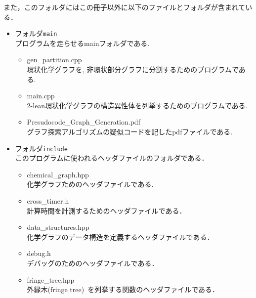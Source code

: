 \documentclass[11pt,titlepage,dvipdfmx,twoside]{jarticle}
\begin{document}
また，このフォルダにはこの冊子以外に以下のファイルとフォルダが含まれている．
%
	\begin{itemize}
		
	\item フォルダ{\tt main}\\
		プログラムを走らせるmainフォルダである.
		\begin{itemize}
			\item{gen\_partition.cpp}\\
				環状化学グラフを, 非環状部分グラフに分割するためのプログラムである.
				
			\item{main.cpp}\\
				2-lean環状化学グラフの構造異性体を列挙するためのプログラムである.

			\item{Presudocode\_Graph\_Generation.pdf}\\
			グラフ探索アルゴリズムの疑似コードを記したpdfファイルである.
		\end{itemize}
		
	\item フォルダ{\tt include}\\
		このプログラムに使われるヘッダファイルのフォルダである．
		\begin{itemize}
			\item{chemical\_graph.hpp}\\
			  化学グラフためのヘッダファイルである.
			\item{cross\_timer.h}\\
				計算時間を計測するためのヘッダファイルである．
				
			\item{data\_structures.hpp}\\
				化学グラフのデータ構造を定義するヘッダファイルである． 
				
			\item{debug.h}\\
				デバッグのためのヘッダファイルである．
				
			\item{fringe\_tree.hpp}\\
				外縁木(fringe tree)~\cite{branch}を列挙する関数のヘッダファイルである．
				

\end{itemize}
\end{itemize}
\end{document}
